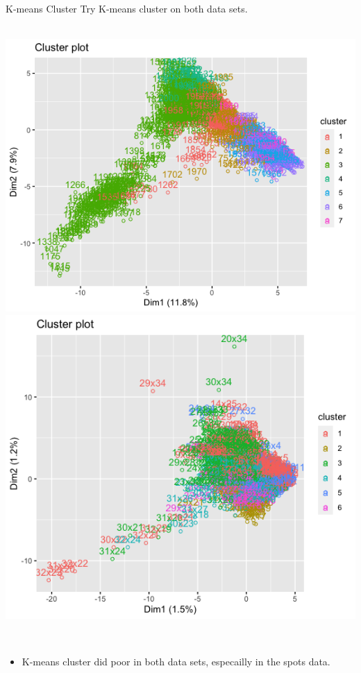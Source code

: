 \documentclass[10 pt]{beamer}
\begin{document}
\begin{frame}{K-means Cluster}
Try K-means cluster on both data sets.
~\\
~\\
\centerline{\includegraphics[scale=0.27]{pic/rna_kmeans.png}
	\includegraphics[scale=0.26]{pic/sp_kmeans.png}}
~\\
\begin{itemize}
	\item K-means cluster did poor in both data sets, especailly in the spots data.
	\end{itemize}
\end{frame}
\end{document}
